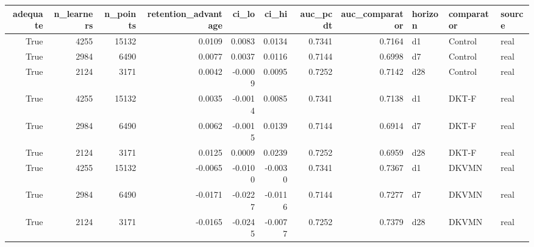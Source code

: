 \begin{tabular}{rrrrrrrrlll}
\toprule
adequate & n\_learners & n\_points & retention\_advantage & ci\_lo & ci\_hi & auc\_pcdt & auc\_comparator & horizon & comparator & source \\
\midrule
True & 4255 & 15132 & 0.0109 & 0.0083 & 0.0134 & 0.7341 & 0.7164 & d1 & Control & real \\
True & 2984 & 6490 & 0.0077 & 0.0037 & 0.0116 & 0.7144 & 0.6998 & d7 & Control & real \\
True & 2124 & 3171 & 0.0042 & -0.0009 & 0.0095 & 0.7252 & 0.7142 & d28 & Control & real \\
True & 4255 & 15132 & 0.0035 & -0.0014 & 0.0085 & 0.7341 & 0.7138 & d1 & DKT-F & real \\
True & 2984 & 6490 & 0.0062 & -0.0015 & 0.0139 & 0.7144 & 0.6914 & d7 & DKT-F & real \\
True & 2124 & 3171 & 0.0125 & 0.0009 & 0.0239 & 0.7252 & 0.6959 & d28 & DKT-F & real \\
True & 4255 & 15132 & -0.0065 & -0.0100 & -0.0030 & 0.7341 & 0.7367 & d1 & DKVMN & real \\
True & 2984 & 6490 & -0.0171 & -0.0227 & -0.0116 & 0.7144 & 0.7277 & d7 & DKVMN & real \\
True & 2124 & 3171 & -0.0165 & -0.0245 & -0.0077 & 0.7252 & 0.7379 & d28 & DKVMN & real \\
\bottomrule
\end{tabular}
